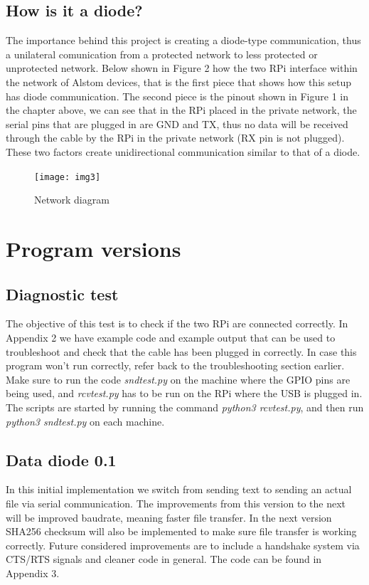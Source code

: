 \documentclass[a4paper, 12pt]{book}
\begin{document}
\subsection{How is it a diode?}
The importance behind this project is creating a diode-type communication, thus a unilateral comunication from a protected network to less protected or unprotected network. Below shown in Figure 2 how the two RPi interface within the network of Alstom devices, that is the first piece that shows how this setup has diode communication. The second piece is the pinout shown in Figure 1 in the chapter above, we can see that in the RPi placed in the private network, the serial pins that are plugged in are GND and TX, thus no data will be received through the cable by the RPi in the private network (RX pin is not plugged). These two factors create unidirectional communication similar to that of a diode.
\begin{figure}[h!]
    \texttt{[image: img3]}
    \caption{Network diagram}
    \label{fig:figure2}
\end{figure}


\section{Program versions}
\subsection{Diagnostic test}
The objective of this test is to check if the two RPi are connected correctly. In Appendix 2 we have example code and example output that can be used to troubleshoot and check that the cable has been plugged in correctly.
In case this program won't run correctly, refer back to the troubleshooting section earlier. Make sure to run the code \textit{sndtest.py} on the machine where the GPIO pins are being used, and \textit{rcvtest.py} has to be run on the RPi where the USB is plugged in.
The scripts are started by running the command \textit{python3 rcvtest.py}, and then run \textit{python3 sndtest.py} on each machine.

\subsection{Data diode 0.1}
In this initial implementation we switch from sending text to sending an actual file via serial communication. The improvements from this version to the next will be improved baudrate, meaning faster file transfer.
In the next version SHA256 checksum will also be implemented to make sure file transfer is working correctly. Future considered improvements are to include a handshake system via CTS/RTS signals and cleaner code in general. The code can be found in Appendix 3.
\end{document}
